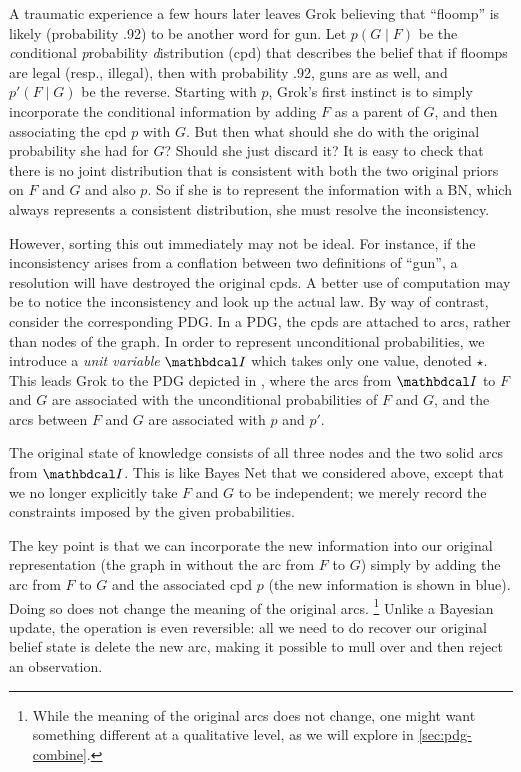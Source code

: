 \begin{example}
A traumatic experience a few hours later leaves Grok believing that
``floomp'' is likely (probability .92) to be another word for gun.
Let $p(G \mid F)$ be the \emph conditional \emph probability \emph
distribution (cpd) that describes 
the belief that if floomps are legal (resp., illegal),
then with probability .92, guns are as well, and $p'(F \mid G)$ be
the reverse. 
Starting with $p$, Grok's first instinct is to
simply incorporate the conditional information by adding $F$ as a parent of
$G$, and then associating
the cpd
$p$ with $G$. But then what should she do
with the original probability she had for $G$?  Should she just discard it?
It is easy to check that there is no 
joint distribution
that is consistent with
both
the two original priors on $F$ and $G$ and also 
$p$.  So if she
is to represent the information with a BN, which always represents a consistent
distribution, she must resolve the inconsistency. 





However, sorting this out immediately may not be ideal. For instance, if the inconsistency arises from a conflation between two definitions of ``gun'', a resolution will have destroyed the original cpds. A better use of computation may be to notice the inconsistency and look up the actual law. 
%
By way of contrast, consider the corresponding PDG. In a PDG, the cpds are
attached to arcs, rather than nodes of the graph.
In order to represent unconditional probabilities, we introduce
a \emph{unit variable} $\pdgunit$ which 
takes only one value, denoted
$\star$. 
This leads Grok to 
the PDG depicted in ,
where the arcs from $\pdgunit$ to $F$ and $G$ are associated with the
unconditional probabilities of $F$ and $G$, and the 
arcs between $F$ and $G$ are associated with $p$ and $p'$.



The original state of knowledge consists of all three nodes and the two solid arcs from $\pdgunit$. This is like Bayes Net that we considered above, except that we no longer explicitly take  $F$ and $G$ to be independent; we merely record the constraints imposed by the given probabilities.  
	
The key point is that we can incorporate the new information into our original
representation (the graph in  without the arc from
$F$ to $G$) simply  by adding the arc from $F$ to $G$ and the associated cpd
$p$ (the new information is shown in blue).
Doing so does not change the meaning of the original arcs.
\unskip\footnote{%
    While the meaning of the original arcs does not change, one might want something different at a qualitative level, as we will explore in \cref{sec:pdg-combine}.
}
Unlike a Bayesian update, the operation is even reversible: all we need
to do recover our original belief state is delete the new arc, 
making it possible to mull over and then reject an observation.
\end{example}


